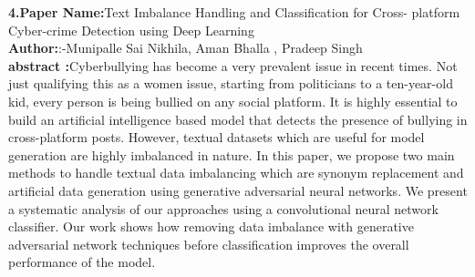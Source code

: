 \documentclass[oneside,a4paper,12pt]{report}
\begin{document}
\item \textbf{4.Paper Name:}Text Imbalance Handling and Classification for Cross- platform Cyber-crime Detection using Deep Learning\\
\textbf{Author:}:-Munipalle Sai Nikhila, Aman Bhalla , Pradeep Singh \\
\textbf{abstract :}Cyberbullying has become a very prevalent issue in recent times. Not just qualifying this as a women issue, starting from politicians to a ten-year-old kid, every person is being bullied on any social platform. It is highly essential to build an artificial intelligence based model that detects the presence of bullying in cross-platform posts. However, textual datasets which are useful for model generation are highly imbalanced in nature. In this paper, we propose two main methods to handle textual data imbalancing which are synonym replacement and artificial data generation using generative adversarial neural networks. We present a systematic analysis of our approaches using a convolutional neural network classifier. Our work shows how removing data imbalance with generative adversarial network techniques before classification improves the overall performance of the model.%

\newpage
\end{document}

